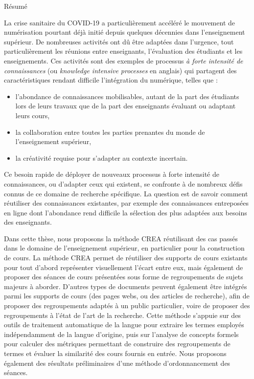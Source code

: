 \begin{center}
\begin{LARGE}
Résumé
\end{LARGE}

\bigskip

\textbf{\@title}

\textbf{\textit{\@subtitle}}

\end{center}

\bigskip



La crise sanitaire du COVID-19 a particulièrement accéléré le mouvement de numérisation pourtant déjà initié depuis quelques décennies dans l'enseignement supérieur.
De nombreuses activités ont dû être adaptées dans l'urgence, tout particulièrement les réunions entre enseignants, l'évaluation des étudiants et les enseignements.
Ces activités sont des exemples de processus \og \textit{à forte intensité de connaissances} \fg (ou \og \textit{knowledge intensive processes} \fg en anglais) qui partagent des caractéristiques rendant difficile l'intégration du numérique, telles que :
\begin{itemize}
\item l'abondance de connaissances mobilisables, autant de la part des étudiants lors de leurs travaux que de la part des enseignants évaluant ou adaptant leurs cours,
\item la collaboration entre toutes les parties prenantes du monde de l'enseignement supérieur,
\item la créativité requise pour s'adapter au contexte incertain.
\end{itemize}
Ce besoin rapide de déployer de nouveaux processus à forte intensité de connaissances, ou d'adapter ceux qui existent, se confronte à de nombreux défis connus de ce domaine de recherche spécifique.
La question est de savoir comment réutiliser des connaissances existantes, par exemple des connaissances entreposées en ligne dont l'abondance rend difficile la sélection des plus adaptées aux besoins des enseignants.

Dans cette thèse, nous proposons la méthode CREA réutilisant des cas passés dans le domaine de l'enseignement supérieur, en particulier pour la construction de cours.
La méthode CREA permet de réutiliser des supports de cours existants pour tout d'abord représenter visuellement l'écart entre eux, mais également de proposer des séances de cours présentées sous forme de regroupements de sujets majeurs à aborder.
D'autres types de documents peuvent également être intégrés parmi les supports de cours (des pages webs, ou des articles de recherche), afin de proposer des regroupements adaptés à un public particulier, voire de proposer des regroupements à l'état de l'art de la recherche.
Cette méthode s'appuie sur des outils de traitement automatique de la langue pour extraire les termes employés indépendamment de la langue d'origine, puis sur l'analyse de concepts formels pour calculer des métriques permettant de construire des regroupements de termes et évaluer la similarité des cours fournis en entrée.
Nous proposons également des résultats préliminaires d'une méthode d'ordonnancement des séances.


